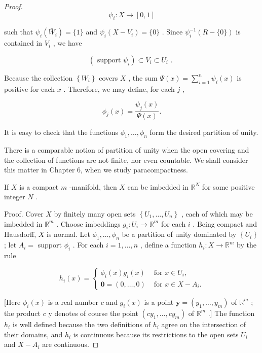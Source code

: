 \begin{proof}
\[
{\psi }_{i} : X \rightarrow  \left\lbrack  {0,1}\right\rbrack
\]

such that \({\psi }_{i}\left( {\bar{W}}_{i}\right)  = \{ 1\}\) and \({\psi }_{i}\left( {X - {V}_{i}}\right)  = \{ 0\}\) . Since \({\psi }_{i}^{-1}\left( {R-\{ 0\} }\right)\) is contained in \({V}_{i}\) , we have

\[
\left( {\text{ support }{\psi }_{i}}\right)  \subset  {\bar{V}}_{i} \subset  {U}_{i}\text{ . }
\]

Because the collection \(\left\{  {W}_{i}\right\}\) covers \(X\) , the sum \(\Psi \left( x\right)  = \mathop{\sum }\limits_{{i = 1}}^{n}{\psi }_{i}\left( x\right)\) is positive for each \(x\) . Therefore, we may define, for each \(j\) ,

\[
{\phi }_{j}\left( x\right)  = \frac{{\psi }_{j}\left( x\right) }{\Psi \left( x\right) }.
\]

It is easy to check that the functions \({\phi }_{1},\ldots ,{\phi }_{n}\) form the desired partition of unity.

There is a comparable notion of partition of unity when the open covering and the collection of functions are not finite, nor even countable. We shall consider this matter in Chapter 6, when we study paracompactness.

\begin{theorem}
	If \(X\) is a compact \(m\) -manifold, then \(X\) can be imbedded in \({\mathbb{R}}^{N}\) for some positive integer \(N\) .

\end{theorem}
Proof. Cover \(X\) by finitely many open sets \(\left\{  {{U}_{1},\ldots ,{U}_{n}}\right\}\) , each of which may be imbedded in \({\mathbb{R}}^{m}\) . Choose imbeddings \({g}_{i} : {U}_{i} \rightarrow  {\mathbb{R}}^{m}\) for each \(i\) . Being compact and Hausdorff, \(X\) is normal. Let \({\phi }_{1},\ldots ,{\phi }_{n}\) be a partition of unity dominated by \(\left\{  {U}_{i}\right\}\) ; let \({A}_{i} =\) support \({\phi }_{i}\) . For each \(i = 1,\ldots ,n\) , define a function \({h}_{i} : X \rightarrow  {\mathbb{R}}^{m}\) by the rule

\[
{h}_{i}\left( x\right)  = \left\{  \begin{array}{ll} {\phi }_{i}\left( x\right) {g}_{i}\left( x\right) & \text{ for }x \in  {U}_{i}, \\  \mathbf{0} = \left( {0,\ldots ,0}\right) & \text{ for }x \in  X - {A}_{i}. \end{array}\right.
\]

[Here \({\phi }_{i}\left( x\right)\) is a real number \(c\) and \({g}_{i}\left( x\right)\) is a point \(\mathbf{y} = \left( {{y}_{1},\ldots ,{y}_{m}}\right)\) of \({\mathbb{R}}^{m}\) ; the product \(c\) y denotes of course the point \(\left( {c{y}_{1},\ldots ,c{y}_{m}}\right)\) of \({\mathbb{R}}^{m}\) .] The function \({h}_{i}\) is well defined because the two definitions of \({h}_{i}\) agree on the intersection of their domains, and \({h}_{i}\) is continuous because its restrictions to the open sets \({U}_{i}\) and \(X - {A}_{i}\) are continuous.


\end{proof}
